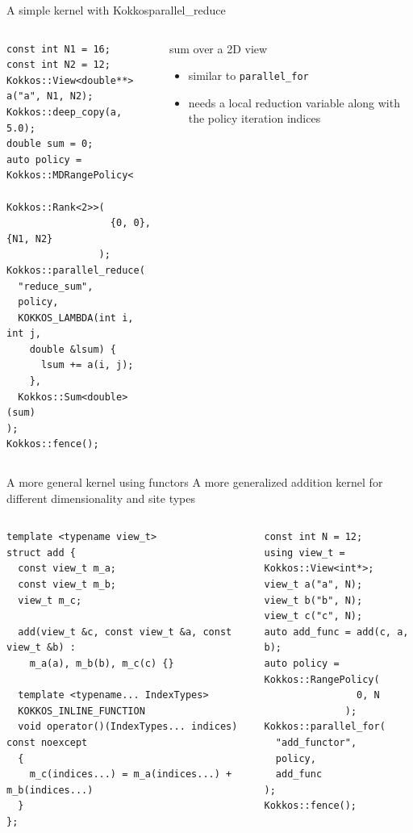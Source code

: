 \begin{frame}[fragile]{A simple kernel with Kokkos}{parallel\_reduce}
  \begin{columns}
      \begin{verbatim}
const int N1 = 16;
const int N2 = 12;
Kokkos::View<double**> a("a", N1, N2);
Kokkos::deep_copy(a, 5.0);
double sum = 0;
auto policy = Kokkos::MDRangePolicy<
                Kokkos::Rank<2>>(
                  {0, 0}, {N1, N2}
                );
Kokkos::parallel_reduce(
  "reduce_sum",
  policy,
  KOKKOS_LAMBDA(int i, int j, 
    double &lsum) {
      lsum += a(i, j);
    },
  Kokkos::Sum<double>(sum)
);
Kokkos::fence();
      \end{verbatim}
      \begin{block}{sum over a 2D view}
        \begin{itemize}
          \item similar to \verb|parallel_for|
          \item needs a local reduction variable along with the policy iteration indices
        \end{itemize}
      \end{block}
    \end{columns}
\end{frame}

\begin{frame}[fragile]{A more general kernel using functors}
  A more generalized addition kernel for different dimensionality and site types
  \begin{columns}
      \begin{verbatim}
template <typename view_t>
struct add {
  const view_t m_a;
  const view_t m_b;
  view_t m_c;

  add(view_t &c, const view_t &a, const view_t &b) :
    m_a(a), m_b(b), m_c(c) {}
  
  template <typename... IndexTypes>
  KOKKOS_INLINE_FUNCTION
  void operator()(IndexTypes... indices) const noexcept
  {
    m_c(indices...) = m_a(indices...) + m_b(indices...)
  }
};
      \end{verbatim}
      \begin{verbatim}
const int N = 12;
using view_t = Kokkos::View<int*>;
view_t a("a", N);
view_t b("b", N);
view_t c("c", N);
auto add_func = add(c, a, b);
auto policy = Kokkos::RangePolicy(
                0, N
              );
Kokkos::parallel_for(
  "add_functor",
  policy,
  add_func
);
Kokkos::fence();
      \end{verbatim}
  \end{columns}
\end{frame}


